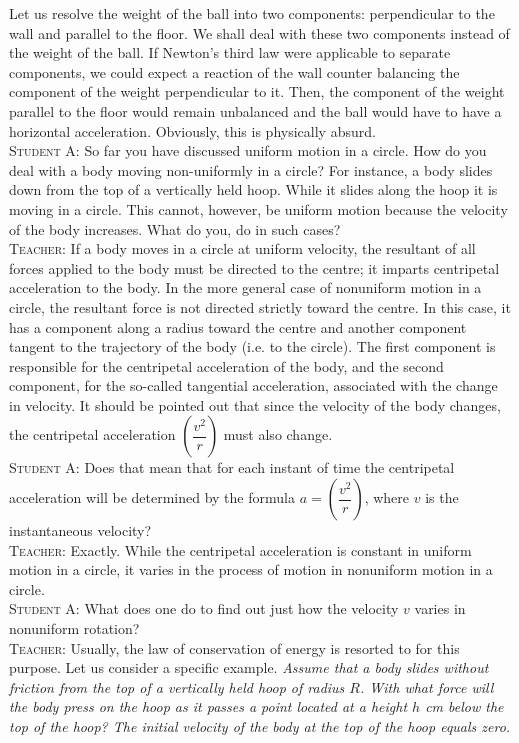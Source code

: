 \documentclass[a4paper,sfsidenotes]{tufte-book}
\begin{document}
Let us resolve the weight of the ball into two components: perpendicular to the wall and parallel to the floor. We shall deal with these two components instead of the weight of the ball. If Newton's third law were applicable to separate components, we could expect a reaction of the wall counter balancing the component of the weight perpendicular to it. Then, the component of the weight parallel to the floor would remain unbalanced and the ball would have to have a horizontal acceleration. Obviously, this is physically absurd.
\\
\textsc{Student A:} So far you have discussed uniform motion in a circle. How do you deal with a body moving non-uniformly in a circle? For instance, a body slides down from the top of a vertically held hoop. While it slides along the hoop it is moving in a circle. This cannot, however, be uniform motion because the velocity of the body increases. What do you, do in such cases?
\\
\textsc{Teacher:} If a body moves in a circle at uniform velocity, the resultant of all forces applied to the body must be directed to the centre; it imparts centripetal acceleration to the body. In the more general case of nonuniform motion in a circle, the resultant force is not directed strictly toward the centre. In this case, it has a component along a radius toward the centre and another component tangent to the trajectory of the body (i.e. to the circle). The first component is responsible for the centripetal acceleration of the body, and the second component, for the so-called tangential acceleration, associated with the change in velocity. It should be pointed out that since the velocity of the body changes, the centripetal acceleration $\left(\dfrac{v^{2}}{r}\right)$ must also change.
\\
\textsc{Student A:} Does that mean that for each instant of time the centripetal acceleration will be determined by the formula $a = \left(\dfrac{v^{2}}{r}\right)$, where $v$ is the instantaneous velocity?
\\
\textsc{Teacher:} Exactly. While the centripetal acceleration is constant in uniform motion in a circle, it varies in the process of motion in nonuniform motion in a circle.
\\
\textsc{Student A:} What does one do to find out just how the velocity $v$ varies in nonuniform rotation?
\\
\textsc{Teacher:} Usually, the law of conservation of energy is resorted to for this purpose. Let us consider a specific example.
\emph{Assume that a body slides without friction from the top of a vertically held hoop of radius $R$. With what force will the body press on the hoop as it passes a point located at a height $h$ \si{\centi\metre} below the top of the hoop? The initial velocity of the body at the top of the hoop equals zero.} 
\end{document}
